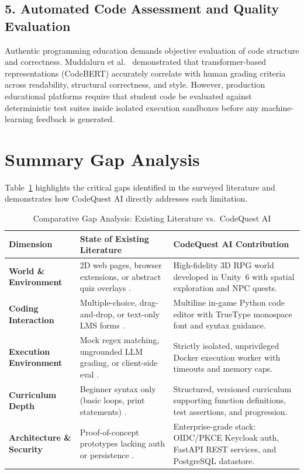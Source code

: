 \subsection{5. Automated Code Assessment and Quality Evaluation}
Authentic programming education demands objective evaluation of code structure and correctness. Muddaluru et al.~\cite{muddaluru2024autograding, muddaluru2023codebertscore} demonstrated that transformer-based representations (CodeBERT) accurately correlate with human grading criteria across readability, structural correctness, and style. However, production educational platforms require that student code be evaluated against deterministic test suites inside isolated execution sandboxes before any machine-learning feedback is generated.

\section{Summary Gap Analysis}
Table~\ref{tab:gap_analysis} highlights the critical gaps identified in the surveyed literature and demonstrates how CodeQuest AI directly addresses each limitation.

\begin{table}[htbp]
\centering
\small
\renewcommand{\arraystretch}{1.2}
\caption{Comparative Gap Analysis: Existing Literature vs.\ CodeQuest AI}
\label{tab:gap_analysis}
\begin{tabularx}{\textwidth}{|p{}|X|X|}
\hline
\rowcolor{gray!25}\textbf{Dimension} & \textbf{State of Existing Literature} & \textbf{CodeQuest AI Contribution} \\ \hline
\textbf{World \& Environment} & 2D web pages, browser extensions, or abstract quiz overlays \cite{li2025tutorllm, ge2025srlagent}. & High-fidelity 3D RPG world developed in Unity~6 with spatial exploration and NPC quests. \\ \hline
\textbf{Coding Interaction} & Multiple-choice, drag-and-drop, or text-only LMS forms \cite{ishaq2024levelup, spriggs2025personalizing}. & Multiline in-game Python code editor with TrueType monospace font and syntax guidance. \\ \hline
\textbf{Execution Environment} & Mock regex matching, ungrounded LLM grading, or client-side eval \cite{costa2025integrating}. & Strictly isolated, unprivileged Docker execution worker with timeouts and memory caps. \\ \hline
\textbf{Curriculum Depth} & Beginner syntax only (basic loops, print statements) \cite{ishaq2024levelup}. & Structured, versioned curriculum supporting function definitions, test assertions, and progression. \\ \hline
\textbf{Architecture \& Security} & Proof-of-concept prototypes lacking auth or persistence \cite{costa2025integrating, wilschut2025agenticknowledge}. & Enterprise-grade stack: OIDC/PKCE Keycloak auth, FastAPI REST services, and PostgreSQL datastore. \\ \hline
\end{tabularx}
\end{table}

